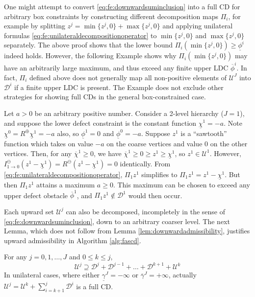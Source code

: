 \documentclass[review,hidelinks,onefignum,onetabnum,final]{siamart220329}  %
\newcommand{\maxR}{R^{\bm{\oplus}}}
\newcommand{\minR}{R^{\bm{\ominus}}}
\begin{document}
One might attempt to convert \eqref{eq:fe:downwardsuminclusion} into a full CD for arbitrary box constraints by constructing different decomposition maps $\Pi_i$, for example by splitting $z^j = \min\{z^j,0\} + \max\{z^j,0\}$ and applying unilateral formulas \eqref{eq:fe:unilateraldecompositionoperator} to $\min\{z^j,0\}$ and $\max\{z^j,0\}$ separately.  The above proof shows that the lower bound $\Pi_i (\min\{z^j,0\}) \ge \underline{\phi}^i$ indeed holds.  However, the following Example shows why $\Pi_i(\min\{z^j,0\})$ may have an arbitrarily large maximum, and thus exceed any finite upper LDC $\overline{\phi}^i$.  In fact, $\Pi_i$ defined above does not generally map all non-positive elements of $\mathcal{U}^J$ into $\mathcal{D}^i$ if a finite upper LDC is present.  The Example does not exclude other strategies for showing full CDs in the general box-constrained case.

\begin{example}  \label{ex:notfullcd}
Let $a > 0$ be an arbitrary positive number.  Consider a 2-level hierarchy ($J=1$), and suppose the lower defect constraint is the constant function $\underline{\chi}^1=-a$.  Note $\underline{\chi}^0=\maxR \underline{\chi}^1=-a$ also, so $\underline{\phi}^1=0$ and $\underline{\phi}^0=-a$.  Suppose $z^1$ is a ``sawtooth'' function which takes on value $-a$ on the coarse vertices and value $0$ on the other vertices.  Then, for any $\overline{\chi}^1\ge 0$, we have $\overline{\chi}^1 \ge 0 \ge z^1\ge \underline{\chi}^1$, so $z^1 \in \mathcal{U}^1$.  However, $I_{1\to 0}^\ominus(z^1 - \underline{\chi}^1) = \minR(z^1 - \underline{\chi}^1) = 0$ identically.  From \eqref{eq:fe:unilateraldecompositionoperator}, $\Pi_1 z^1$ simplifies to $\Pi_1 z^1 = z^1 - \underline{\chi}^1$.  But then $\Pi_1 z^1$ attains a maximum $a\ge 0$.  This maximum can be chosen to exceed any upper defect obstacle $\overline{\phi}^1$, and $\Pi_1 z^1 \notin \mathcal{D}^1$ would then occur.
\end{example}

Each upward set $\mathcal{U}^j$ can also be decomposed, incompletely in the sense of \eqref{eq:fe:downwardsuminclusion}, down to an arbitrary coarser level.  The next Lemma, which does not follow from Lemma \ref{lem:downwardadmissibility}, justifies upward admissibility in Algorithm \ref{alg:fascd}.

\begin{lemma}  \label{lem:upwardadmissibility}  For any $j=0,1,\dots,J$ and $0\le k\le j$,
\begin{equation}
\mathcal{U}^j \supseteq \mathcal{D}^j + \mathcal{D}^{j-1} + \dots + \mathcal{D}^{k+1} + \mathcal{U}^k \label{eq:fe:upwardsuminclusion}
\end{equation}
In unilateral cases, where either $\underline{\gamma}^J=-\infty$ or $\overline{\gamma}^J=+\infty$, actually $\mathcal{U}^j = \mathcal{U}^k + \sum_{i=k+1}^j \mathcal{D}^i$ is a full CD. \end{lemma}
\end{document}
